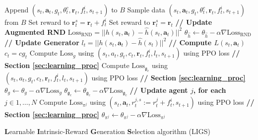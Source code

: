 \documentclass{article}
\begin{document}
\begin{algorithm}[h]
{{{            }
            Append $(s_t, \boldsymbol{a}_t, g_t, \theta^c_t, \boldsymbol{r}_t, f^i_t, s_{t+1})$ to $B$
        }
        {
            Sample data $(s_t, \boldsymbol{a}_t, g_t, \theta^c_t, \boldsymbol{r}_t, f^i_t, s_{t+1})$ from $B$\;
            {   
                Set reward to $\boldsymbol{r}_t^s = \boldsymbol{r}_t + f^i_t$
            }
            {
                Set reward to $\boldsymbol{r}_t^s = \boldsymbol{r}_t$
            }
            \textbf{// Update Augmented RND} \;
            $\text{Loss}_{\text{RND}} = ||h(s_t,\boldsymbol{a}_t) - \hat{h}(s_t,\boldsymbol{a}_t)||^2$ \;
            $\theta_{\hat{h}} \gets \theta_{\hat{h}} - \alpha \nabla \text{Loss}_{\text{RND}} $ \;
            \textbf{// Update {\selectfont Generator} }\;
            $l_t = ||h(s_t,\boldsymbol{a}_t) - \hat{h}(s_t)||^2$ \textbf{// Compute $L(s_t,\boldsymbol{a}_t)$} \;
            $c_t = c g_t$ \;
            Compute $\text{Loss}_{g}$ using $(s_t, a_t, g_t, c_t, \boldsymbol{r}_t, f^i_t, l_t, s_{t+1})$ using PPO loss \textbf{// Section \ref{sec:learning_proc}} \;
            Compute $\text{Loss}_{ \mathfrak{g}_{c}}$ using $(s_t, a_t, g_t, c_t, \boldsymbol{r}_t, f^i_t, l_t, s_{t+1})$ using PPO loss \textbf{// Section \ref{sec:learning_proc}}\;
            $\theta_{g} \gets \theta_{g} - \alpha \nabla \text{Loss}_{g}$ \;
            $\theta_{\mathfrak{g}_{c}} \gets \theta_{\mathfrak{g}_{c}} - \alpha \nabla \text{Loss}_{\mathfrak{g}_{c}}$ \;
            \textbf{// Update agent $j$, for each $ j \in 1,\ldots, N$}\;
            Compute $\text{Loss}_{ \pi^j}$ using $(s_t, \boldsymbol{a}_t, r^{j,s}_t:=r^j_t+f^i_t, s_{t+1})$ using PPO loss \textbf{// Section \ref{sec:learning_proc}} \;
            $\theta_{\pi^j} \gets \theta_{\pi^j} - \alpha \nabla \text{Loss}_{\pi^j}$ \;
        }
    }
	\caption{\textbf{L}earnable \textbf{I}ntrinsic-Reward \textbf{G}eneration \textbf{S}election algorithm (LIGS)}
\end{algorithm}
\newpage
\end{document}
